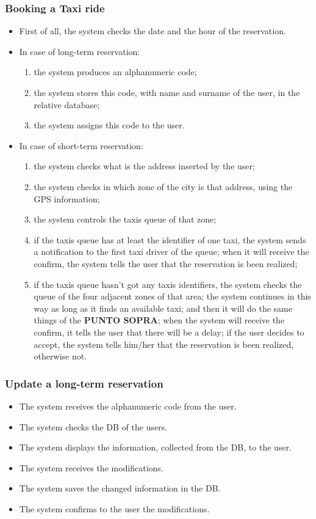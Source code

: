 		\subsubsection{Booking a Taxi ride}
		\begin{itemize}
		\item First of all, the system checks the date and the hour of the reservation. 
		\item In case of long-term reservation:
		\begin{enumerate}
		\item the system produces an alphanumeric code;
		\item the system stores this code, with name and surname of the user, in the relative database;
		\item the system assigns this code to the user.
		\end{enumerate}
		\item In case of short-term reservation:
		\begin{enumerate}
		\item the system checks what is the address inserted by the user;
		\item the system checks in which zone of the city is that address, using the GPS information;
		\item the system controls the taxis queue of that zone;
		\item if the taxis queue has at least the identifier of one taxi, the system sends a notification to the first taxi driver of the queue; when it will receive the confirm, the system tells the user that the reservation is been realized;
		\item if the taxis queue hasn't got any taxis identifiers, the system checks the queue of the four adjacent zones of that area; the system continues in this way as long as it finds an available taxi; and then it will do the same things of the \textbf {PUNTO SOPRA}; when the system will receive the confirm, it tells the user that there will be a delay; if the user decides to accept, the system tells him/her that the reservation is been realized, otherwise not.
		\end{enumerate}
		\end{itemize}
		\subsubsection{Update a long-term reservation}
		\begin{itemize}
		\item The system receives the alphanumeric code from the user.
		\item The system checks the DB of the users.
		\item The system displays the information, collected from the DB, to the user.
		\item The system receives the modifications.
		\item The system saves the changed information in the DB.
		\item The system confirms to the user the modifications.
		\end{itemize}
